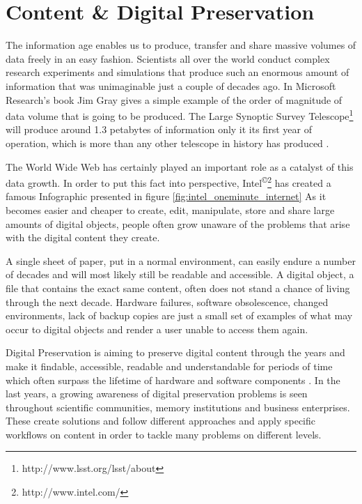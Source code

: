 \section{Content \& Digital Preservation}
\label{ch:content_and_digital_preservation}
The information age enables us to produce, transfer and share massive volumes of data freely in an easy fashion. Scientists all over the world conduct complex research experiments and simulations that produce such an enormous amount of information that was unimaginable just a couple of decades ago. In Microsoft Research's book Jim Gray gives a simple example of the order of magnitude of data volume that is going to be produced. The Large Synoptic Survey Telescope\footnote{http://www.lsst.org/lsst/about} will produce around 1.3 petabytes of information only it its first year of operation, which is more than any other telescope in history has produced \cite{Gray:2009:fourthparadigm}.

The World Wide Web has certainly played an important role as a catalyst of this data growth. In order to put this fact into perspective, Intel\textsuperscript{\copyright}\footnote{http://www.intel.com/} has created a famous Infographic presented in figure \ref{fig:intel_oneminute_internet}
As it becomes easier and cheaper to create, edit, manipulate, store and share large amounts of digital objects, people often grow unaware of the problems that arise with the digital content they create.

A single sheet of paper, put in a normal environment, can easily endure a number of decades and will most likely still be readable and accessible. A digital object, a file that contains the exact same content, often does not stand a chance of living through the next decade. Hardware failures, software obsolescence, changed environments, lack of backup copies are just a small set of examples of what may occur to digital objects and render a user unable to access them again.

Digital Preservation is aiming to preserve digital content through the years and make it findable, accessible, readable and understandable for periods of time which often surpass the lifetime of hardware and software components \cite{DBLP:journals/dlib/RosenthalRLRM05}. In the last years, a growing awareness of digital preservation problems is seen throughout scientific communities, memory institutions and business enterprises. These create solutions and follow different approaches and apply specific workflows on content in order to tackle many problems on different levels.

